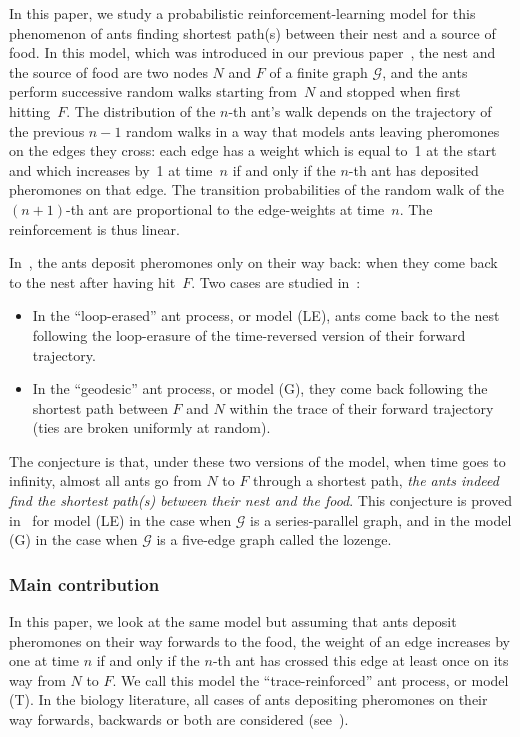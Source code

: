 \documentclass[JEP,XML,SOM,Unicode,NoFloatCountersInSection,published]{cedram}
\let\mathcal\mathscr
\numberwithin{equation}{section}
\theoremstyle{definition}
\begin{document}
In this paper, we study a probabilistic reinforcement-learning model
for this phenomenon of ants finding shortest path(s) between their nest and a source of food.
In this model, which was introduced in our previous paper~\cite{KMS},
the nest and the source of food are two nodes $N$ and $F$ of a finite graph $\mathcal G$,
and the ants perform successive random walks starting from~$N$ and stopped when first hitting~$F$.
The distribution of the $n$-th ant's walk depends on the trajectory of the previous $n-1$ random walks in a way that models ants leaving pheromones on the edges they cross:
each edge has a weight which is equal to~{1} at the start and which increases by~1
at time~$n$ if and only if the $n$-th ant has deposited pheromones on that edge.
The transition probabilities of the random walk of the $(n+1)$-th ant are proportional to the edge-weights at time~$n$.
The reinforcement is thus linear.

In~\cite{KMS}, the ants deposit pheromones only on their way back:
\ie when they come back to the nest after having hit~$F$.
Two cases are studied in~\cite{KMS}:
\begin{itemize}
\item In the ``loop-erased'' ant process, or model (LE), ants come back to the nest following the loop-erasure of the time-reversed version of their forward trajectory.
\item In the ``geodesic'' ant process, or model (G), they come back following the shortest path between $F$ and $N$ within the trace of their forward trajectory (ties are broken uniformly at random).
\end{itemize}
The conjecture is that, under these two versions of the model, when time goes to infinity, almost all ants go from $N$ to $F$ through a shortest path, \ie \emph{the ants indeed find the shortest path(s) between their nest and the food}.
This conjecture is proved in~\cite{KMS} for model (LE) in the case when $\mathcal G$ is a series-parallel graph, and in the model (G) in the case when $\mathcal G$ is a five-edge graph called the lozenge.

\subsubsection*{Main contribution} In this paper, we look at the same model
but assuming that ants deposit pheromones on their way forwards to the food,
\ie the weight of an edge increases by one at time $n$ if and only
if the $n$-th ant has crossed this edge at least once on its way from $N$ to $F$.
We call this model the ``trace-reinforced'' ant process, or model (T).
In the biology literature, all cases of ants depositing pheromones on their way forward{s},
backwards or both are considered (see~\cite[Ch.\,1]{book_ant}).
\end{document}
